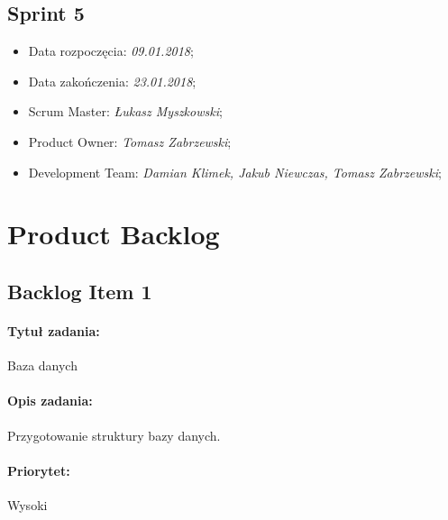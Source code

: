 \documentclass[a4paper]{article}
\begin{document}
	\subsection{Sprint 5}

	\begin{itemize}
		\item Data rozpoczęcia: \emph{09.01.2018};
		\item  Data zakończenia: \emph{23.01.2018};
		\item Scrum Master: \emph{Łukasz Myszkowski};
		\item Product Owner: \emph{Tomasz Zabrzewski};
		\item Development Team: \emph{Damian Klimek, Jakub Niewczas, Tomasz Zabrzewski};
	\end{itemize}
	
	\section{Product Backlog}
	
	\subsection{Backlog Item 1}
	\paragraph{Tytuł zadania:} Baza danych
	\paragraph{Opis zadania:} Przygotowanie struktury bazy danych.
	\paragraph{Priorytet:} Wysoki
\end{document}
